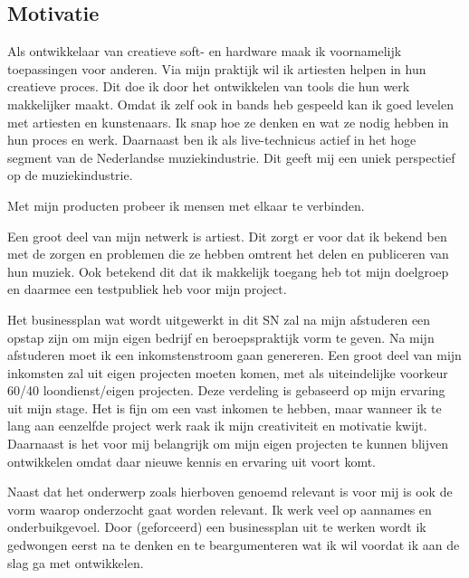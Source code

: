 \subsection{Motivatie}
Als ontwikkelaar van creatieve soft- en hardware maak ik voornamelijk toepassingen voor anderen. Via mijn praktijk wil ik artiesten helpen in hun creatieve proces. Dit doe ik door het ontwikkelen van tools die hun werk makkelijker maakt. Omdat ik zelf ook in bands heb gespeeld kan ik goed levelen met artiesten en kunstenaars. Ik snap hoe ze denken en wat ze nodig hebben in hun proces en werk. Daarnaast ben ik als live-technicus actief in het hoge segment van de Nederlandse muziekindustrie. Dit geeft mij een uniek perspectief op de muziekindustrie.

Met mijn producten probeer ik mensen met elkaar te verbinden.

Een groot deel van mijn netwerk is artiest. Dit zorgt er voor dat ik bekend ben met de zorgen en problemen die ze hebben omtrent het delen en publiceren van hun muziek. Ook betekend dit dat ik makkelijk toegang heb tot mijn doelgroep en daarmee een testpubliek heb voor mijn project.

Het businessplan wat wordt uitgewerkt in dit SN zal na mijn afstuderen een opstap zijn om mijn eigen bedrijf en beroepspraktijk vorm te geven. Na mijn afstuderen moet ik een inkomstenstroom gaan genereren. Een groot deel van mijn inkomsten zal uit eigen projecten moeten komen, met als uiteindelijke voorkeur 60/40 loondienst/eigen projecten. Deze verdeling is gebaseerd op mijn ervaring uit mijn stage. Het is fijn om een vast inkomen te hebben, maar wanneer ik te lang aan eenzelfde project werk raak ik mijn creativiteit en motivatie kwijt. Daarnaast is het voor mij belangrijk om mijn eigen projecten te kunnen blijven ontwikkelen omdat daar nieuwe kennis en ervaring uit voort komt.

Naast dat het onderwerp zoals hierboven genoemd relevant is voor mij is ook de vorm waarop onderzocht gaat worden relevant. Ik werk veel op aannames en onderbuikgevoel. Door (geforceerd) een businessplan uit te werken wordt ik gedwongen eerst na te denken en te beargumenteren wat ik wil voordat ik aan de slag ga met ontwikkelen.

